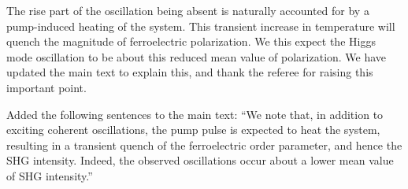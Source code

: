 The rise part of the oscillation being absent is naturally accounted for by a pump-induced heating of the system.
This transient increase in temperature will quench the magnitude of ferroelectric polarization. We this expect the Higgs mode oscillation to be about this reduced mean value of polarization. 
We have updated the main text to explain this, and thank the referee for raising this important point.

\begin{changesmade}
Added the following sentences to the main text: ``We note that, in addition to exciting coherent oscillations, the pump pulse is expected to heat the system, resulting in a transient quench of the ferroelectric order parameter, and hence the SHG intensity.
Indeed, the observed oscillations occur about a lower mean value of SHG intensity.''
\end{changesmade}

